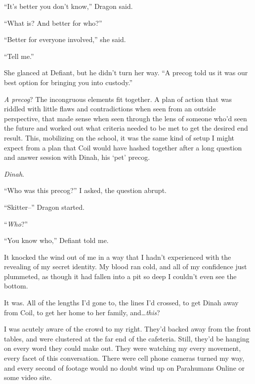 ``It's better you don't know,'' Dragon said.



``What is?  And better for who?''



``Better for everyone involved,'' she said.



``Tell me.''



She glanced at Defiant, but he didn't turn her way.  ``A precog told us it was our best option for bringing you into custody.''



\emph{A precog}?  The incongruous elements fit together.  A plan of action that was riddled with little flaws and contradictions when seen from an outside perspective, that made sense when seen through the lens of someone who'd seen the future and worked out what criteria needed to be met to get the desired end result.  This, mobilizing on the school, it was the same kind of setup I might expect from a plan that Coil would have hashed together after a long question and answer session with Dinah, his `pet' precog.



\emph{Dinah}.



``Who was this precog?'' I asked, the question abrupt.



``Skitter--''  Dragon started.



``\emph{Who}?''



``You know who,'' Defiant told me.



It knocked the wind out of me in a way that I hadn't experienced with the revealing of my secret identity.  My blood ran cold, and all of my confidence just plummeted, as though it had fallen into a pit so deep I couldn't even see the bottom.



It was.  All of the lengths I'd gone to, the lines I'd crossed, to get Dinah away from Coil, to get her home to her family, and\ldots \emph{this}?



I was acutely aware of the crowd to my right.  They'd backed away from the front tables, and were clustered at the far end of the cafeteria.  Still, they'd be hanging on every word they could make out.  They were watching my every movement, every facet of this conversation.  There were cell phone cameras turned my way, and every second of footage would no doubt wind up on Parahumans Online or some video site.



